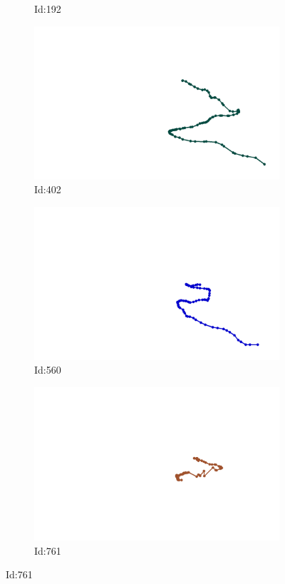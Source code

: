 \documentclass[12pt,twoside]{report}
\begin{document}
\begin{figure}
\begin{subfigure}[b]{0.20\textwidth}
\caption{Id:192}
\end{subfigure}
\begin{subfigure}[b]{0.20\textwidth}
\centering
\includegraphics[width=\textwidth]{../../trajectories/402.png}
\caption{Id:402}
\end{subfigure}
\begin{subfigure}[b]{0.20\textwidth}
\centering
\includegraphics[width=\textwidth]{../../trajectories/560.png}
\caption{Id:560}
\end{subfigure}
\begin{subfigure}[b]{0.20\textwidth}
\centering
\includegraphics[width=\textwidth]{../../trajectories/761.png}
\caption{Id:761}
\end{subfigure}
\end{figure}
\end{document}
